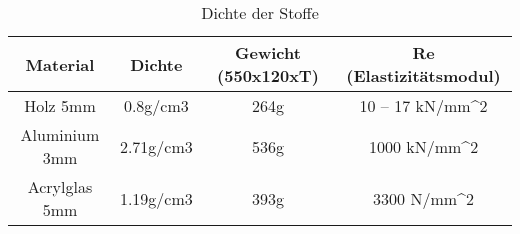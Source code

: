\begin{table}[h!]
	\centering
	\caption{Dichte der Stoffe}

	\begin{tabular}{|c|c|c|c|}
		\hline Material & Dichte & Gewicht (550x120xT) & Re (Elastizitätsmodul) \\ 
		\hline Holz 5mm & 0.8g/cm3 & 264g & 10 – 17 kN/mm^2 \\ 
		\hline Aluminium 3mm & 2.71g/cm3 & 536g & 1000 kN/mm^2 \\ 
		\hline Acrylglas 5mm & 1.19g/cm3 & 393g & 3300 N/mm^2  \\ 
		\hline 
	\end{tabular} 
\end{table}
 		
 			

